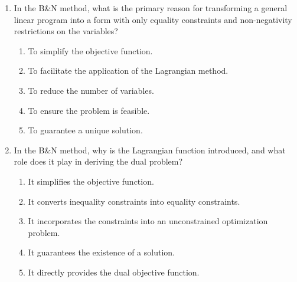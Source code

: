 \documentclass{article}%
\begin{document}
\begin{enumerate}
\begin{enumerate}
\item The B\&N method directly transforms the primal problem's objective function into the dual objective function using matrix operations, without considering constraints.%
\item The B\&N method first transforms the primal problem into a form with only equality constraints, then introduces a Lagrangian function to incorporate these constraints into an unconstrained problem. The dual problem is then derived by analyzing the properties of the Lagrangian and applying the weak duality theorem.%
\item The B\&N method uses the graphical method to visualize the feasible region of the primal problem and then geometrically constructs the dual problem's feasible region.%
\item The B\&N method is an iterative algorithm that alternates between solving the primal and dual problems until convergence, without explicitly using the Lagrangian.%
\end{enumerate}%
\vspace{1em}%
\item In the B&N method, what is the primary reason for transforming a general linear program into a form with only equality constraints and non-negativity restrictions on the variables?%
\begin{enumerate}%
\item To simplify the objective function.%
\item To facilitate the application of the Lagrangian method.%
\item To reduce the number of variables.%
\item To ensure the problem is feasible.%
\item To guarantee a unique solution.%
\end{enumerate}%
\vspace{1em}%
\item In the B&N method, why is the Lagrangian function introduced, and what role does it play in deriving the dual problem?%
\begin{enumerate}%
\item It simplifies the objective function.%
\item It converts inequality constraints into equality constraints.%
\item It incorporates the constraints into an unconstrained optimization problem.%
\item It guarantees the existence of a solution.%
\item It directly provides the dual objective function.%

\end{enumerate}
\end{enumerate}
\end{document}
